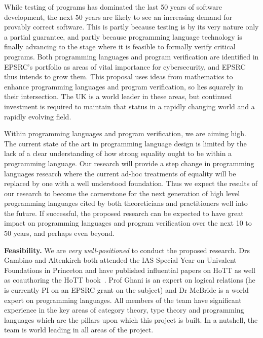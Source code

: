 \documentclass[a4paper,11pt]{article}
\begin{document}
While testing of programs has dominated the last 50 years of software
development,
the next 50 years are likely to see an increasing
demand for provably correct software. This is partly because testing
is by its very nature only a partial guarantee, and partly because
programming language technology is finally advancing to the stage
where it is feasible to formally verify critical programs.
Both programming languages and program verification are identified in
EPSRC's portfolio as areas of vital 
importance for cybersecurity, and EPSRC
thus intends to grow them.
This proposal 
uses ideas from mathematics  to enhance 
programming languages and  program
verification, so lies squarely in their intersection. %
The UK is a world leader
in these areas, but continued investment is required to maintain that
status in a rapidly changing world and a rapidly evolving field.

Within programming languages and program verification, we are aiming
high.  The current state of the art in programming language design is
limited by the lack of a clear understanding of how strong equality
ought to be within a programming language. Our research will provide a
step change in programming languages research where the current
ad-hoc treatments of equality will be replaced by one with a well
understood foundation. Thus we expect the results of our research to
become the cornerstone for the next generation of high level
programming languages cited by both
theoreticians and practitioners well into the future. If successful, 
the proposed research can
be expected to have great impact on programming languages and program
verification over the next 10 to 50 years, and perhaps even beyond. 

\vspace*{0.02in}

{\bf Feasibility.} We are {\em very well-positioned} to conduct the
proposed research. Drs Gambino and Altenkirch both attended the IAS
Special Year on Univalent Foundations in Princeton and have published
influential papers on HoTT as well as coauthoring the HoTT book~\cite{hott-book}. Prof
Ghani is an expert on logical relations (he is currently PI on an
EPSRC grant on the subject) and Dr McBride is a world expert on
programming languages. All members of the team have significant
experience in the key areas of category theory, type theory and
programming languages which are the pillars upon which this project is
built. In a nutshell, the team is world leading in all areas of the
project.
\end{document}

